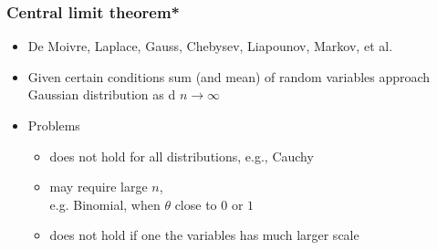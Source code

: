 \documentclass[english,t]{beamer}
\begin{document}
\begin{frame}

  \frametitle{Central limit theorem*}

  \begin{itemize}
  \item De Moivre, Laplace, Gauss, Chebysev, Liapounov, Markov, et al.
  \item Given certain conditions sum (and mean) of random variables
    approach Gaussian distribution as d $n \rightarrow \infty$
  \item Problems
    \begin{itemize}
    \item does not hold for all distributions, e.g., Cauchy
    \item may require large $n$,\\ e.g.
      Binomial, when $\theta$ close to $0$ or $1$
    \item does not hold if one the variables has much larger scale
    \end{itemize}
  \end{itemize}

\end{frame}


\end{document}
